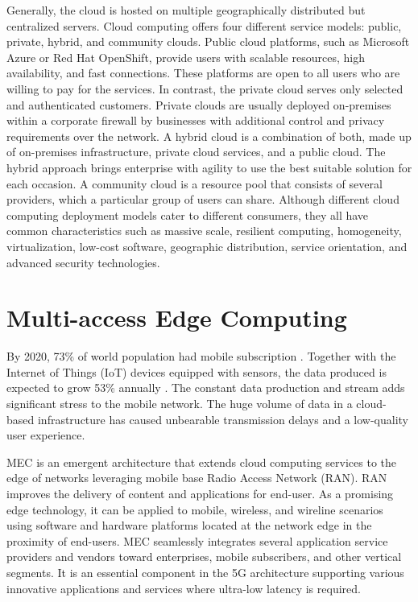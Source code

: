 Generally, the cloud is hosted on multiple geographically distributed but centralized servers. Cloud computing offers four different service models: public, private, hybrid, and community clouds. Public cloud platforms, such as Microsoft Azure or Red Hat OpenShift, provide users with scalable resources, high availability, and fast connections. These platforms are open to all users who are willing to pay for the services. In contrast, the private cloud serves only selected and authenticated customers. Private clouds are usually deployed on-premises within a corporate firewall by businesses with additional control and privacy requirements over the network. A hybrid cloud is a combination of both, made up of on-premises infrastructure, private cloud services, and a public cloud. The hybrid approach brings enterprise with agility to use the best suitable solution for each occasion\cite{NetApp}. A community cloud is a resource pool that consists of several providers, which a particular group of users can share. Although different cloud computing deployment models cater to different consumers, they all have common characteristics such as massive scale, resilient computing, homogeneity, virtualization, low-cost software, geographic distribution, service orientation, and advanced security technologies. \cite{MicrosoftAzure}\cite{Taleb2017}\cite{Xing2012}

\section{Multi-access Edge Computing}

By 2020, 73\% of world population had mobile subscription \cite{StatistaMobileSubscribers}. Together with the Internet of Things (IoT) devices equipped with sensors, the data produced is expected to grow 53\% annually \cite{Ning2019}. The constant data production and stream adds significant stress to the mobile network. The huge volume of data in a cloud-based infrastructure has caused unbearable transmission delays and a low-quality user experience.

MEC is an emergent architecture that extends cloud computing services to the edge of networks leveraging mobile base Radio Access Network (RAN). RAN improves the delivery of content and applications for end-user. As a promising edge technology, it can be applied to mobile, wireless, and wireline scenarios using software and hardware platforms located at the network edge in the proximity of end-users. MEC seamlessly integrates several application service providers and vendors toward enterprises, mobile subscribers, and other vertical segments. It is an essential component in the 5G architecture supporting various innovative applications and services where ultra-low latency is required. \cite{Abbas2018}

